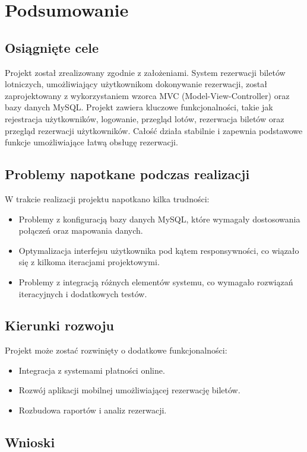 \section{Podsumowanie}

\subsection{Osiągnięte cele}

Projekt został zrealizowany zgodnie z założeniami. System rezerwacji biletów lotniczych, umożliwiający użytkownikom dokonywanie rezerwacji, został zaprojektowany z wykorzystaniem wzorca MVC (Model-View-Controller) oraz bazy danych MySQL. Projekt zawiera kluczowe funkcjonalności, takie jak rejestracja użytkowników, logowanie, przegląd lotów, rezerwacja biletów oraz przegląd rezerwacji użytkowników. Całość działa stabilnie i zapewnia podstawowe funkcje umożliwiające łatwą obsługę rezerwacji.

\subsection{Problemy napotkane podczas realizacji}

W trakcie realizacji projektu napotkano kilka trudności:
\begin{itemize}
\item Problemy z konfiguracją bazy danych MySQL, które wymagały dostosowania połączeń oraz mapowania danych.
\item Optymalizacja interfejsu użytkownika pod kątem responsywności, co wiązało się z kilkoma iteracjami projektowymi.
\item Problemy z integracją różnych elementów systemu, co wymagało rozwiązań iteracyjnych i dodatkowych testów.
\end{itemize}

\subsection{Kierunki rozwoju}

Projekt może zostać rozwinięty o dodatkowe funkcjonalności:
\begin{itemize}
\item Integracja z systemami płatności online.
\item Rozwój aplikacji mobilnej umożliwiającej rezerwację biletów.
\item Rozbudowa raportów i analiz rezerwacji.

\end{itemize}

\subsection{Wnioski}
